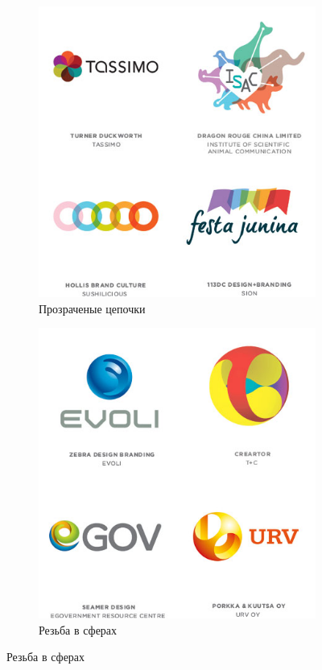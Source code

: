 \begin{figure}[h!]
  \ContinuedFloat
  \centering
  \begin{subfigure}{.45\textwidth}
    \centering
    \includegraphics[width=\linewidth]{images/supplement/logolounge/2012/Prozrachnie-zepochki.jpeg}
    \caption[]{Прозраченые цепочки}
    \label{fig:logolounge:2012:prozrachnie-zerpochki}
  \end{subfigure}
  \hfill
  \centering
  \begin{subfigure}{.45\textwidth}
    \centering
    \includegraphics[width=\linewidth]{images/supplement/logolounge/2012/Rezba-v-sferah.jpeg}
    \caption[]{Резьба в сферах}
    \label{fig:logolounge:2012:rezba-v-sferah}
  \end{subfigure}


\end{figure}
